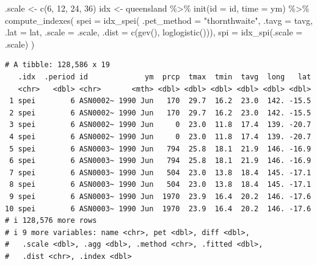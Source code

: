\documentclass[
]{interact}
\newenvironment{Shaded}{\begin{snugshade}}{\end{snugshade}}
\newcommand{\AttributeTok}[1]{\textcolor[rgb]{0.40,0.45,0.13}{#1}}
\newcommand{\DecValTok}[1]{\textcolor[rgb]{0.68,0.00,0.00}{#1}}
\newcommand{\FunctionTok}[1]{\textcolor[rgb]{0.28,0.35,0.67}{#1}}
\newcommand{\NormalTok}[1]{\textcolor[rgb]{0.00,0.23,0.31}{#1}}
\newcommand{\OtherTok}[1]{\textcolor[rgb]{0.00,0.23,0.31}{#1}}
\newcommand{\SpecialCharTok}[1]{\textcolor[rgb]{0.37,0.37,0.37}{#1}}
\newcommand{\StringTok}[1]{\textcolor[rgb]{0.13,0.47,0.30}{#1}}
\begin{document}
\begin{Shaded}
\begin{Highlighting}[]
\NormalTok{.scale }\OtherTok{\textless{}{-}} \FunctionTok{c}\NormalTok{(}\DecValTok{6}\NormalTok{, }\DecValTok{12}\NormalTok{, }\DecValTok{24}\NormalTok{, }\DecValTok{36}\NormalTok{)}
\NormalTok{idx }\OtherTok{\textless{}{-}}\NormalTok{ queensland }\SpecialCharTok{\%\textgreater{}\%}
  \FunctionTok{init}\NormalTok{(}\AttributeTok{id =}\NormalTok{ id, }\AttributeTok{time =}\NormalTok{ ym) }\SpecialCharTok{\%\textgreater{}\%}
  \FunctionTok{compute\_indexes}\NormalTok{(}
    \AttributeTok{spei =} \FunctionTok{idx\_spei}\NormalTok{(}
      \AttributeTok{.pet\_method =} \StringTok{"thornthwaite"}\NormalTok{, }\AttributeTok{.tavg =}\NormalTok{ tavg, }\AttributeTok{.lat =}\NormalTok{ lat, }
      \AttributeTok{.scale =}\NormalTok{ .scale, }\AttributeTok{.dist =} \FunctionTok{c}\NormalTok{(}\FunctionTok{gev}\NormalTok{(), }\FunctionTok{loglogistic}\NormalTok{())),}
    \AttributeTok{spi =} \FunctionTok{idx\_spi}\NormalTok{(}\AttributeTok{.scale =}\NormalTok{ .scale)}
\NormalTok{  )}
\end{Highlighting}
\end{Shaded}

\begin{verbatim}
# A tibble: 128,586 x 19
   .idx  .period id             ym  prcp  tmax  tmin  tavg  long   lat
   <chr>   <dbl> <chr>       <mth> <dbl> <dbl> <dbl> <dbl> <dbl> <dbl>
 1 spei        6 ASN0002~ 1990 Jun   170  29.7  16.2  23.0  142. -15.5
 2 spei        6 ASN0002~ 1990 Jun   170  29.7  16.2  23.0  142. -15.5
 3 spei        6 ASN0002~ 1990 Jun     0  23.0  11.8  17.4  139. -20.7
 4 spei        6 ASN0002~ 1990 Jun     0  23.0  11.8  17.4  139. -20.7
 5 spei        6 ASN0003~ 1990 Jun   794  25.8  18.1  21.9  146. -16.9
 6 spei        6 ASN0003~ 1990 Jun   794  25.8  18.1  21.9  146. -16.9
 7 spei        6 ASN0003~ 1990 Jun   504  23.0  13.8  18.4  145. -17.1
 8 spei        6 ASN0003~ 1990 Jun   504  23.0  13.8  18.4  145. -17.1
 9 spei        6 ASN0003~ 1990 Jun  1970  23.9  16.4  20.2  146. -17.6
10 spei        6 ASN0003~ 1990 Jun  1970  23.9  16.4  20.2  146. -17.6
# i 128,576 more rows
# i 9 more variables: name <chr>, pet <dbl>, diff <dbl>,
#   .scale <dbl>, .agg <dbl>, .method <chr>, .fitted <dbl>,
#   .dist <chr>, .index <dbl>
\end{verbatim}
\end{document}

